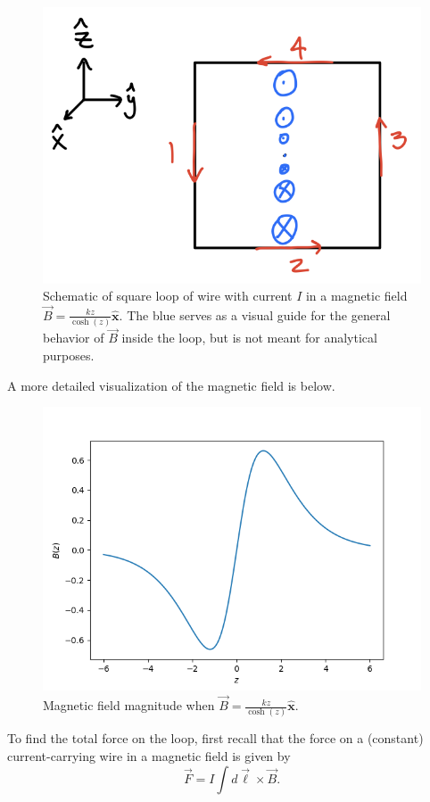\documentclass{article}
\newcommand{\xhat}{\hat{\textbf{x}}}
\begin{document}
\begin{figure}[htbp]
	\centering
	\includegraphics[width = .5\textwidth]{5.4.png}
	\caption{Schematic of square loop of wire with current $I$ in a magnetic field $\vec{B} = \frac{kz}{\cosh(z)}\xhat$. The blue serves as a visual guide for the general behavior of $\vec{B}$ inside the loop, but is not meant for analytical purposes.}\label{fig:5.4}
\end{figure}

A more detailed visualization of the magnetic field is below.
\begin{figure}[htbp]
	\centering
	\includegraphics[width = .5\textwidth]{BFieldCosh.png}
	\caption{Magnetic field magnitude when $\vec{B} = \frac{kz}{\cosh(z)}\xhat$.}\label{fig:B_cosh}
\end{figure}

To find the total force on the loop, first recall that the force on a (constant) current-carrying wire in a magnetic field is given by
\begin{equation}
	\vec{F} = I\int d\vec{\ell}\times\vec{B}.
\end{equation}
\end{document}
